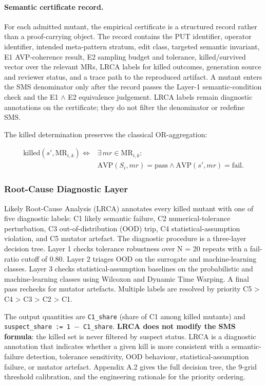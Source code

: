 \documentclass[manuscript,screen,review]{acmart}
\begin{document}
\paragraph{Semantic certificate record.}
For each admitted mutant, the empirical certificate is a structured
record rather than a proof-carrying object. The record contains the PUT
identifier, operator identifier, intended meta-pattern stratum, edit
class, targeted semantic invariant, E1 AVP-coherence result, E2 sampling
budget and tolerance, killed/survived vector over the relevant MRs, LRCA
labels for killed outcomes, generation source and reviewer status, and a
trace path to the reproduced artifact. A mutant enters the SMS
denominator only after the record passes the Layer-1 semantic-condition
check and the E1 $\wedge$ E2 equivalence judgement. LRCA labels remain
diagnostic annotations on the certificate; they do not filter the
denominator or redefine SMS.

The killed determination preserves the classical OR-aggregation:

\[
\begin{aligned}
\mathrm{killed}(s', \mathrm{MR}_{i,k}) \iff{} & \exists\,mr \in \mathrm{MR}_{i,k}: \\
& \mathrm{AVP}(S_i, mr) = \text{pass} \wedge
  \mathrm{AVP}(s', mr) = \text{fail}.
\end{aligned}
\]

\subsubsection{Root-Cause Diagnostic Layer}\label{lrca-engineering-attribution-layer-descriptive-not-in-sms}

Likely Root-Cause Analysis (LRCA) annotates every killed mutant with one
of five diagnostic labels: C1 likely semantic failure, C2
numerical-tolerance perturbation, C3 out-of-distribution (OOD) trip, C4
statistical-assumption violation, and C5 mutator artefact. The diagnostic
procedure is a three-layer decision tree.
Layer 1 checks tolerance robustness over N = 20 repeats with a
fail-ratio cutoff of 0.80. Layer 2 triages OOD on the surrogate and
machine-learning classes. Layer 3 checks statistical-assumption
baselines on the probabilistic and machine-learning classes using
Wilcoxon and Dynamic Time Warping. A final pass rechecks for mutator
artefacts. Multiple labels are resolved by priority C5 \textgreater{} C4
\textgreater{} C3 \textgreater{} C2 \textgreater{} C1.

The output quantities are \texttt{C1\_share} (share of C1 among killed
mutants) and \texttt{suspect\_share\ :=\ 1\ $-$\ C1\_share}. \textbf{LRCA
does not modify the SMS formula}: the killed set is never filtered by
suspect status. LRCA is a diagnostic annotation that indicates
whether a given kill is more consistent with a semantic-failure
detection, tolerance sensitivity, OOD behaviour, statistical-assumption
failure, or mutator artefact. Appendix A.2 gives the full decision tree, the 9-grid
threshold calibration, and the engineering rationale for the priority
ordering.
\end{document}
